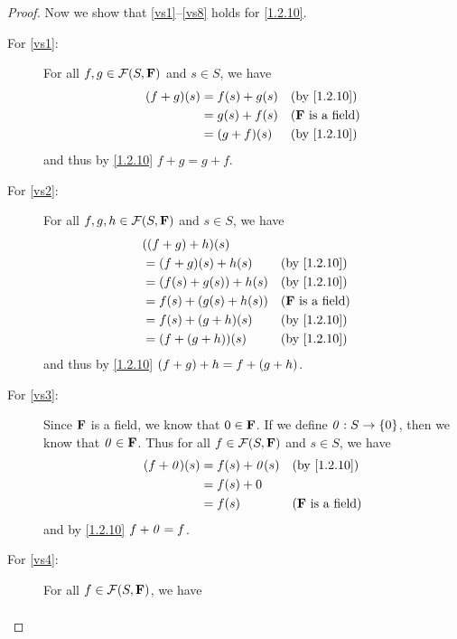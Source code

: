 \begin{proof}
  Now we show that \ref{vs1}--\ref{vs8} holds for \cref{1.2.10}.
  \begin{description}
    \item[For \ref{vs1}:]
      For all \(f, g \in \FS\) and \(s \in S\), we have
      \begin{align*}
        \p{f + g}\p{s} & = f\p{s} + g\p{s} &  & \text{(by \cref{1.2.10})}  \\
                       & = g\p{s} + f\p{s} &  & \text{(\(\F\) is a field)} \\
                       & = \p{g + f}\p{s}  &  & \text{(by \cref{1.2.10})}
      \end{align*}
      and thus by \cref{1.2.10} \(f + g = g + f\).
    \item[For \ref{vs2}:]
      For all \(f, g, h \in \FS\) and \(s \in S\), we have
      \begin{align*}
         & \p{\p{f + g} + h}\p{s}                                         \\
         & = \p{f + g}\p{s} + h\p{s}      &  & \text{(by \cref{1.2.10})}  \\
         & = \p{f\p{s} + g\p{s}} + h\p{s} &  & \text{(by \cref{1.2.10})}  \\
         & = f\p{s} + \p{g\p{s} + h\p{s}} &  & \text{(\(\F\) is a field)} \\
         & = f\p{s} + \p{g + h}\p{s}      &  & \text{(by \cref{1.2.10})}  \\
         & = \p{f + \p{g + h}}\p{s}       &  & \text{(by \cref{1.2.10})}
      \end{align*}
      and thus by \cref{1.2.10} \(\left\lparen f + g\right\rparen + h = f + \left\lparen g + h\right\rparen\).
    \item[For \ref{vs3}:]
      Since \(\mathbf{F}\) is a field, we know that \(0 \in \mathbf{F}\).
      If we define \(\mathit{0} : S \to \{0\}\), then we know that \(\mathit{0} \in \mathbf{F}\).
      Thus for all \(f \in \FS\) and \(s \in S\), we have
      \begin{align*}
        \p{f + \zv}\p{s} & = f\p{s} + \zv\p{s} &  & \text{(by \cref{1.2.10})}  \\
                         & = f\p{s} + 0                                        \\
                         & = f\p{s}            &  & \text{(\(\F\) is a field)}
      \end{align*}
      and by \cref{1.2.10} \(f + \mathit{0} = f\).
    \item[For \ref{vs4}:]
      For all \(f \in \FS\), we have
      \begin{align*}

\end{align*}
\end{description}
\end{proof}
